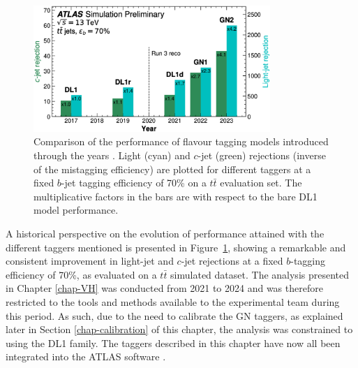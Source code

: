 \begin{figure}[h!]
  \center
  \includegraphics[width=0.8\textwidth]{Images/FTAG/storyFtag.png}
  \caption{Comparison of the performance of flavour tagging models introduced through the years \cite{ATL-PLOT-FTAG-2023-01}. Light (cyan) and $c$-jet (green) rejections (inverse of the mistagging efficiency) are plotted for different taggers at a fixed $b$-jet tagging efficiency of 70\% on a $t\bar{t}$ evaluation set. The multiplicative factors in the bars are with respect to the bare DL1 model performance.} 
  \label{fig:storyFtag}
\end{figure}

A historical perspective on the evolution of performance attained with the different taggers mentioned is presented in Figure~\ref{fig:storyFtag}, showing a remarkable and consistent improvement in light-jet and $c$-jet rejections at a fixed $b$-tagging efficiency of 70\%, as evaluated on a $t\bar{t}$ simulated dataset. The analysis presented in Chapter \ref{chap-VH} was conducted from 2021 to 2024 and was therefore restricted to the tools and methods available to the experimental team during this period. As such, due to the need to calibrate the GN taggers, as explained later in Section \ref{chap-calibration} of this chapter, the analysis was constrained to using the DL1 family. The taggers described in this chapter have now all been integrated into the ATLAS software \cite{ATL-SOFT-PUB-2021-001}. 

